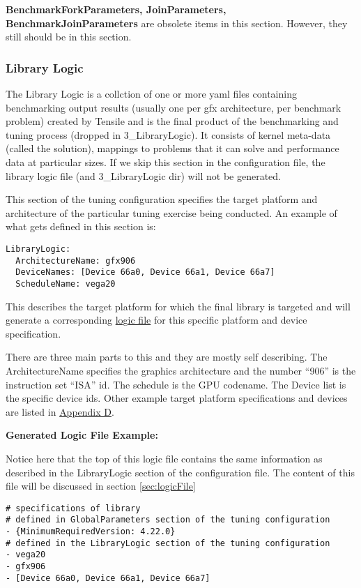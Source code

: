\documentclass[]{article}
\begin{document}
\textbf{BenchmarkForkParameters, JoinParameters, BenchmarkJoinParameters} are obsolete items in this section. However, they still should be in this section.


\subsubsection{Library Logic}
\label{sec:LibraryLogic}

The Library Logic is a collction of one or more yaml files containing benchmarking output results (usually one per gfx architecture, per benchmark problem) created by Tensile and is the final product of the benchmarking and tuning process (dropped in 3\_LibraryLogic). It consists of kernel meta-data (called the solution), mappings to problems that it can solve and performance data at particular sizes. If we skip this section in the configuration file, the library logic file (and 3\_LibraryLogic dir) will not be generated.

This section of the tuning configuration specifies the target platform and architecture of the particular tuning exercise being conducted. An example of what gets defined in this section is:

\begin{verbatim}
LibraryLogic:
  ArchitectureName: gfx906
  DeviceNames: [Device 66a0, Device 66a1, Device 66a7]
  ScheduleName: vega20
\end{verbatim}
\noindent
This describes the target platform for which the final library is targeted and will generate a corresponding \hyperref[sec:logicFile]{logic file} for this specific platform and device specification. \newline

\noindent
There are three main parts to this and they are mostly self describing. The ArchitectureName specifies the graphics architecture and the number ``906'' is the instruction set ``ISA'' id. The schedule is the GPU codename. The Device list is the specific device ids. Other example target platform specifications and devices are listed in \hyperref[sec:appendixD]{Appendix D}. \newline


\noindent \textbf{Generated Logic File Example:}

\noindent
Notice here that the top of this logic file contains the same information as described in the LibraryLogic section of the configuration file. The content of this file will be discussed in section \ref{sec:logicFile} \newline
\begin{verbatim}
# specifications of library
# defined in GlobalParameters section of the tuning configuration
- {MinimumRequiredVersion: 4.22.0}
# defined in the LibraryLogic section of the tuning configuration
- vega20
- gfx906
- [Device 66a0, Device 66a1, Device 66a7]
\end{verbatim}
\end{document}
